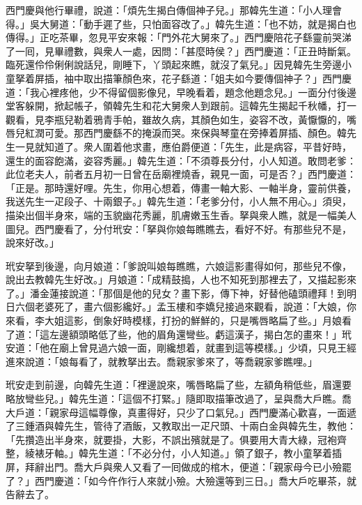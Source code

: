 西門慶與他行畢禮，說道：「煩先生揭白傳個神子兒。」那韓先生道：「小人理會得。」吳大舅道：「動手遲了些，只怕面容改了。」韓先生道：「也不妨，就是揭白也傳得。」正吃茶畢，忽見平安來報：「門外花大舅來了。」西門慶陪花子繇靈前哭涕了一囘，見畢禮數，與衆人一處，因問：「甚麼時侯？」西門慶道：「正丑時斷氣。臨死還伶伶俐俐說話兒，剛睡下，丫頭起來瞧，就沒了氣兒。」因見韓先生旁邊小童拏着屏插，袖中取出描筆顏色來，花子繇道：「姐夫如今要傳個神子？」西門慶道：「我心裡疼他，少不得留個影像兒，早晚看着，題念他題念兒。」一面分付後邊堂客躲開，掀起帳子，領韓先生和花大舅衆人到跟前。這韓先生揭起千秋幡，打一觀看，見李瓶兒勒着鴉青手帕，雖故久病，其顏色如生，姿容不改，黃懨懨的，嘴唇兒紅潤可愛。那西門慶繇不的掩淚而哭。來保與琴童在旁捧着屏插、顏色。韓先生一見就知道了。衆人圍着他求畫，應伯爵便道：「先生，此是病容，平昔好時，還生的面容飽滿，姿容秀麗。」{}韓先生道：「不須尊長分付，小人知道。敢問老爹：此位老夫人，前者五月初一日曾在岳廟裡燒香，親見一面，可是否？」{}西門慶道：「正是。那時還好哩。先生，你用心想着，傳畫一軸大影、一軸半身，靈前供養，我送先生一疋段子、十兩銀子。」韓先生道：「老爹分付，小人無不用心。」須臾，描染出個半身來，端的玉貌幽花秀麗，肌膚嫩玉生香。拏與衆人瞧，就是一幅美人圖兒。西門慶看了，分付玳安：「拏與你娘每瞧瞧去，看好不好。有那些兒不是，說來好改。」

玳安拏到後邊，向月娘道：「爹說叫娘每瞧瞧，六娘這影畫得如何，那些兒不像，說出去教韓先生好改。」月娘道：「成精鼓搗，人也不知死到那裡去了，又描起影來了。」潘金蓮接說道：「那個是他的兒女？畫下影，傳下神，好替他磕頭禮拜！到明日六個老婆死了，畫六個影纔好。」孟玉樓和李嬌兒接過來觀看，說道：「大娘，你來看，李大姐這影，倒象好時模樣，打扮的鮮鮮的，只是嘴唇略扁了些。」月娘看了道：「這左邊額頭略低了些，他的眉角還彎些。虧這漢子，揭白怎的畫來！」玳安道：「他在廟上曾見過六娘一面，剛纔想着，就畫到這等模樣。」少頃，只見王經進來說道：「娘每看了，就教拏出去。喬親家爹來了，等喬親家爹瞧哩。」

玳安走到前邊，向韓先生道：「裡邊說來，嘴唇略扁了些，左額角稍低些，眉還要略放彎些兒。」韓先生道：「這個不打緊。」隨即取描筆改過了，呈與喬大戶瞧。喬大戶道：「親家母這幅尊像，真畫得好，只少了口氣兒。」西門慶滿心歡喜，一面遞了三鍾酒與韓先生，管待了酒飯，又教取出一疋尺頭、十兩白金與韓先生，教他：「先攢造出半身來，就要掛，大影，不誤出殯就是了。俱要用大青大綠，冠袍齊整，綾裱牙軸。」韓先生道：「不必分付，小人知道。」領了銀子，教小童拏着插屏，拜辭出門。喬大戶與衆人又看了一囘做成的棺木，便道：「親家母今已小殮罷了？」西門慶道：「如今仵作行人來就小殮。大殮還等到三日。」喬大戶吃畢茶，就告辭去了。

